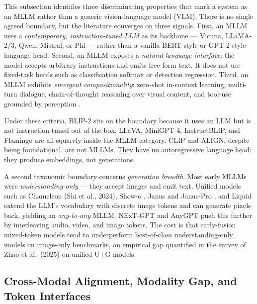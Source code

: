 \documentclass{article}
\begin{document}
This subsection identifies three discriminating properties that mark a system as an MLLM rather than a generic vision-language model (VLM). There is no single agreed boundary, but the literature converges on three signals. First, an MLLM uses a \emph{contemporary, instruction-tuned LLM} as its backbone --- Vicuna, LLaMA-2/3, Qwen, Mistral, or Phi --- rather than a vanilla BERT-style or GPT-2-style language head. Second, an MLLM exposes a \emph{natural-language interface}: the model accepts arbitrary instructions and emits free-form text. It does not use fixed-task heads such as classification softmax or detection regression. Third, an MLLM exhibits \emph{emergent compositionality}: zero-shot in-context learning, multi-turn dialogue, chain-of-thought reasoning over visual content, and tool-use grounded by perception \citep{wang20242024}.

Under these criteria, BLIP-2 sits on the boundary because it uses an LLM but is not instruction-tuned out of the box. LLaVA, MiniGPT-4, InstructBLIP, and Flamingo are all squarely inside the MLLM category. CLIP and ALIGN, despite being foundational, are not MLLMs. They have no autoregressive language head: they produce embeddings, not generations.

A second taxonomic boundary concerns \emph{generation breadth}. Most early MLLMs were \emph{understanding-only} --- they accept images and emit text. Unified models such as Chameleon (Shi et al., 2024), Show-o \citep{xie20242024}, Janus and Janus-Pro \citep{wu20242024}, and Liquid \citep{wu20242024} extend the LLM's vocabulary with discrete image tokens and can generate pixels back, yielding an \emph{any-to-any} MLLM. NExT-GPT \citep{wu20242024} and AnyGPT push this further by interleaving audio, video, and image tokens. The cost is that early-fusion mixed-token models tend to underperform best-of-class understanding-only models on image-only benchmarks, an empirical gap quantified in the survey of Zhao et al.~(2025) on unified U+G models.

\subsection{Cross-Modal Alignment, Modality Gap, and Token Interfaces}\label{cross-modal-alignment-modality-gap-and-token-interfaces}
\end{document}
